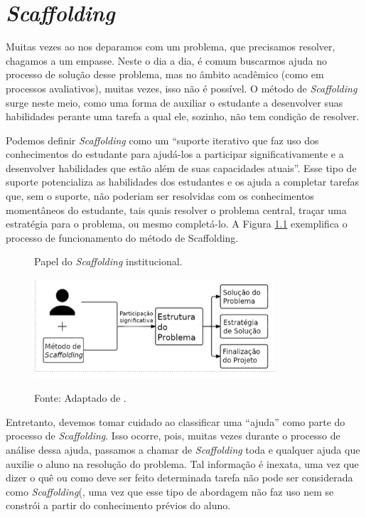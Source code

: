 \chapter{\textit{Scaffolding}}\label{ch:schaffolding}

Muitas vezes ao nos deparamos com um problema, que precisamos resolver, chagamos a um empasse. Neste o dia a dia, é comum buscarmos ajuda no processo de solução desse problema, mas no âmbito acadêmico (como em processos avaliativos), muitas vezes, isso não é possível. O método de \textit{Scaffolding} surge neste meio, como uma forma de auxiliar o estudante a desenvolver suas habilidades perante uma tarefa a qual ele, sozinho, não tem condição de resolver. 

Podemos definir \textit{Scaffolding} \cite{Belland2017, wood1976} como um “suporte iterativo que faz uso dos conhecimentos do estudante para ajudá-los a participar significativamente e a desenvolver habilidades que estão além de suas capacidades atuais”. Esse tipo de suporte potencializa as habilidades dos estudantes e os ajuda a completar tarefas que, sem o suporte, não poderiam ser resolvidas com os conhecimentos momentâneos do estudante, tais quais resolver o problema central, traçar uma estratégia para o problema, ou mesmo completá-lo. A Figura \ref{fig:scaffoldingInstitucional} exemplifica o processo de funcionamento do método de Scaffolding. 

\begin{figure}[htp]
\begin{center}
\caption{Papel do \textit{Scaffolding} institucional.}
\includegraphics[width=0.8\textwidth]{fig/scaffoldinInstitucional.png}
\label{fig:scaffoldingInstitucional}
\caption*{Fonte: Adaptado de .}
\end{center}
\end{figure}

Entretanto, devemos tomar cuidado ao classificar uma “ajuda” como parte do processo de \textit{Scaffolding}. Isso ocorre, pois, muitas vezes durante o processo de análise dessa ajuda, passamos a chamar de \textit{Scaffolding} toda e qualquer ajuda que auxilie o aluno na resolução do problema. Tal informação é inexata, uma vez que dizer o quê ou como deve ser feito determinada tarefa não pode ser considerada como \textit{Scaffolding}(\cite{Belland2017}, uma vez que esse tipo de abordagem não faz uso nem se constrói a partir do conhecimento prévios do aluno. 

